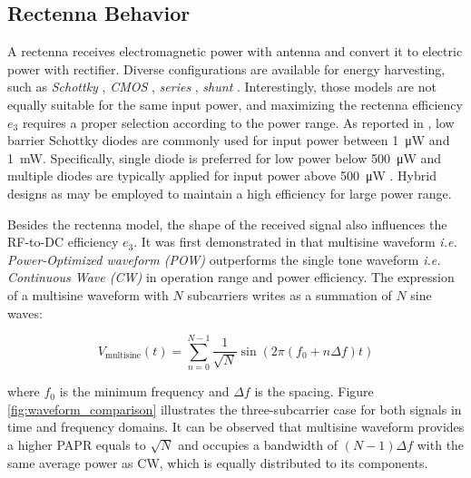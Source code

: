 \subsection{Rectenna Behavior}\label{sec:rectenna-behavior}

A rectenna receives electromagnetic power with antenna and convert it to electric power with rectifier. Diverse configurations are available for energy harvesting, such as \textit{Schottky} \cite{Akkermans2005, Boaventura2013}, \textit{CMOS} \cite{Stoopman2014, Valenta2014}, \textit{series} \cite{Georgiadis2011, Collado2013}, \textit{shunt} \cite{McSpadden1998, Guo2012}. Interestingly, those models are not equally suitable for the same input power, and maximizing the rectenna efficiency ${e_3}$ requires a proper selection according to the power range. As reported in \cite{Valenta2014, Costanzo2016}, low barrier Schottky diodes are commonly used for input power between \SI{1}{\uW} and \SI{1}{\mW}. Specifically, single diode is preferred for low power below \SI{500}{\uW} and multiple diodes are typically applied for input power above \SI{500}{\uW} \cite{Clerckx2019}. Hybrid designs as \cite{Sun2013} may be employed to maintain a high efficiency for large power range.

Besides the rectenna model, the shape of the received signal also influences the RF-to-DC efficiency ${e_3}$. It was first demonstrated in \cite{Trotter2009} that multisine waveform \textit{i.e. Power-Optimized waveform (POW)} outperforms the single tone waveform \textit{i.e. Continuous Wave (CW)} in operation range and power efficiency. The expression of a multisine waveform with $N$ subcarriers writes as a summation of $N$ sine waves:

\begin{equation}\label{eqn:multisine}
  {V_{{\text{multisine}}}}(t) = \sum\limits_{n = 0}^{N - 1} {\frac{1}{{\sqrt N }}} \sin \left( {2\pi \left( {{f_{\text{0}}} + n\Delta f} \right)t} \right)
\end{equation}

where ${{f_{\text{0}}}}$ is the minimum frequency and ${\Delta f}$ is the spacing. Figure \ref{fig:waveform_comparison} \cite{Trotter2009} illustrates the three-subcarrier case for both signals in time and frequency domains. It can be observed that multisine waveform provides a higher PAPR equals to ${\sqrt N }$ and occupies a bandwidth of $(N - 1) \Delta f$ with the same average power as CW, which is equally distributed to its components.

